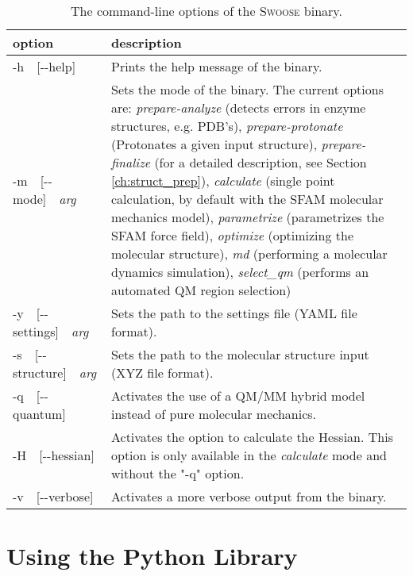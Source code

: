 \documentclass[]{tufte-book}
\begin{document}
\begin{table}[h]
\renewcommand{\baselinestretch}{1.3}
\renewcommand{\arraystretch}{1.3}
\caption{\label{tab:command_line_options} \small The command-line options of the
\textsc{Swoose} binary.}
\begin{center}
\begin{tabular}{L{3.3cm} L{6.7cm}}
\hline
\hline
 option & description \\
\hline
-h~~[-{}-help] & Prints the help message of the binary. \\
-m~~[-{}-mode]~~\textit{arg} & Sets the mode of the binary. The current options are: \textit{prepare-analyze} (detects errors in enzyme structures, e.g. PDB's), \textit{prepare-protonate} (Protonates a given input structure), \textit{prepare-finalize} (for a detailed description, see Section \ref{ch:struct_prep}), \textit{calculate} (single point calculation, by default with the SFAM molecular mechanics model),
\textit{parametrize} (parametrizes the SFAM force field), \textit{optimize} (optimizing the molecular structure), \textit{md} (performing a molecular dynamics simulation), \textit{select\_qm} (performs an automated QM region selection) \\

-y~~[-{}-settings]~~\textit{arg} & Sets the path to the settings file (YAML file format). \\
-s~~[-{}-structure]~~\textit{arg} & Sets the path to the molecular structure input (XYZ file format). \\
-q~~[-{}-quantum] & Activates the use of a QM/MM hybrid model instead of pure molecular mechanics.\\
-H~~[-{}-hessian] & Activates the option to calculate the Hessian. This option is only available in the \textit{calculate} mode and without the "-q" option. \\
-v~~[-{}-verbose] & Activates a more verbose output from the binary. \\
\hline
\hline
\end{tabular}
\renewcommand{\baselinestretch}{1.0}
\renewcommand{\arraystretch}{1.0}
\end{center}
\end{table}


\chapter{Using the Python Library}\label{ch:use_python_library}
\end{document}
